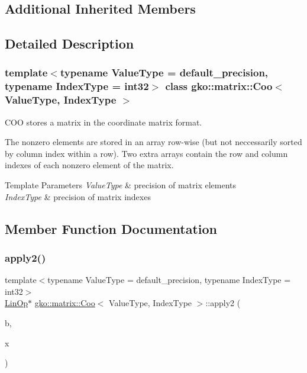\subsection*{Additional Inherited Members}


\subsection{Detailed Description}
\subsubsection*{template$<$typename Value\+Type = default\+\_\+precision, typename Index\+Type = int32$>$\newline
class gko\+::matrix\+::\+Coo$<$ Value\+Type, Index\+Type $>$}

C\+OO stores a matrix in the coordinate matrix format. 

The nonzero elements are stored in an array row-\/wise (but not neccessarily sorted by column index within a row). Two extra arrays contain the row and column indexes of each nonzero element of the matrix.


\begin{DoxyTemplParams}{Template Parameters}
{\em Value\+Type} & precision of matrix elements \\
\hline
{\em Index\+Type} & precision of matrix indexes \\
\hline
\end{DoxyTemplParams}


\subsection{Member Function Documentation}
\mbox{\label{classgko_1_1matrix_1_1Coo_ad2e97eee0ad21f8896f4a82cc5ac8a50}} 
\subsubsection{\texorpdfstring{apply2()}{apply2()}\hspace{0.1cm}{\footnotesize\ttfamily [1/4]}}
{\footnotesize\ttfamily template$<$typename Value\+Type = default\+\_\+precision, typename Index\+Type = int32$>$ \\
\hyperlink{classgko_1_1LinOp}{Lin\+Op}$\ast$ \hyperlink{classgko_1_1matrix_1_1Coo}{gko\+::matrix\+::\+Coo}$<$ Value\+Type, Index\+Type $>$\+::apply2 (\begin{DoxyParamCaption}\item[{const \hyperlink{classgko_1_1LinOp}{Lin\+Op} $\ast$}]{b,  }\item[{\hyperlink{classgko_1_1LinOp}{Lin\+Op} $\ast$}]{x }\end{DoxyParamCaption})\hspace{0.3cm}{\ttfamily [inline]}}



